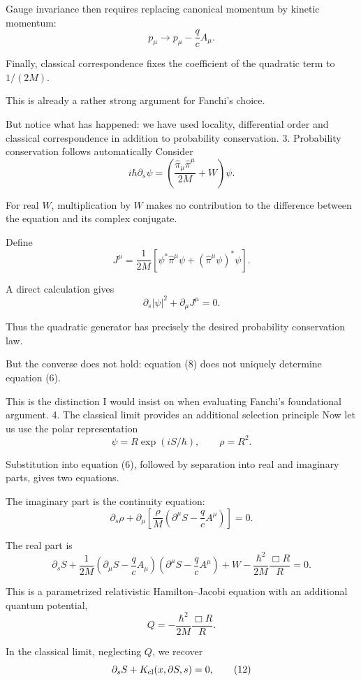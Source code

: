 Gauge invariance then requires replacing canonical momentum by kinetic momentum:
\[
p_\mu\longrightarrow p_\mu-\frac qc A_\mu.
\]

Finally, classical correspondence fixes the coefficient of the quadratic term to \(1/(2M)\).

This is already a rather strong argument for Fanchi's choice.

But notice what has happened: we have used locality, differential order and classical correspondence in addition to probability conservation.
3. Probability conservation follows automatically
Consider
\[
i\hbar\partial_s\psi
=
\left(
\frac{\hat\pi_\mu\hat\pi^\mu}{2M}+W
\right)\psi.
\tag{6}
\]

For real \(W\), multiplication by \(W\) makes no contribution to the difference between the equation and its complex conjugate.

Define
\[
J^\mu=
\frac{1}{2M}
\left[
\psi^*\hat\pi^\mu\psi+
(\hat\pi^\mu\psi)^*\psi
\right].
\tag{7}
\]

A direct calculation gives
\[
\boxed{
\partial_s|\psi|^2+\partial_\mu J^\mu=0.
}
\tag{8}
\]

Thus the quadratic generator has precisely the desired probability conservation law.

But the converse does not hold: equation (8) does not uniquely determine equation (6).

This is the distinction I would insist on when evaluating Fanchi's foundational argument.
4. The classical limit provides an additional selection principle
Now let us use the polar representation
\[
\psi=R\exp(iS/\hbar),
\qquad \rho=R^2.
\]

Substitution into equation (6), followed by separation into real and imaginary parts, gives two equations.

The imaginary part is the continuity equation:
\[
\partial_s\rho+
\partial_\mu\left[
\frac{\rho}{M}
\left(\partial^\mu S-\frac qc A^\mu\right)
\right]=0.
\tag{9}
\]

The real part is
\[
\boxed{
\partial_s S+
\frac{1}{2M}
\left(\partial_\mu S-\frac qc A_\mu\right)
\left(\partial^\mu S-\frac qc A^\mu\right)
+W
-\frac{\hbar^2}{2M}
\frac{\Box R}{R}
=0.
}
\tag{10}
\]

This is a parametrized relativistic Hamilton–Jacobi equation with an additional quantum potential,
\[
Q=-\frac{\hbar^2}{2M}\frac{\Box R}{R}.
\tag{11}
\]

In the classical limit, neglecting \(Q\), we recover
\[
\partial_s S+K_{\rm cl}(x,\partial S,s)=0,
\tag{12}
\]

